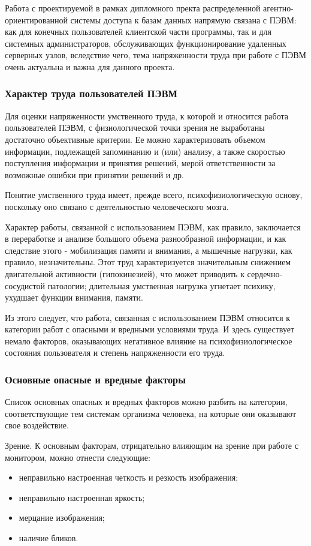 Работа с проектируемой в рамках дипломного пректа распределенной агентно-ориентированной системы доступа к базам данных напрямую связана с  ПЭВМ: как для конечных пользователей клиентской части программы, так и для системных администраторов, обслуживающих функционирование удаленных серверных узлов, вследствие чего, тема напряженности труда при работе с ПЭВМ очень актуальна и важна для данного проекта.

\subsubsection{Характер труда пользователей ПЭВМ}
Для оценки напряженности умственного труда, к которой и относится работа пользователей ПЭВМ, с физиологической точки зрения не выработаны достаточно объективные критерии. Ее можно характеризовать объемом информации, подлежащей запоминанию и (или) анализу, а также скоростью поступления информации и принятия решений, мерой ответственности за возможные ошибки при принятии решений и др.

Понятие умственного труда имеет, прежде всего, психофизиологическую основу, поскольку оно связано с деятельностью человеческого мозга.

Характер работы, связанной с использованием ПЭВМ, как правило, заключается в переработке и анализе большого объема разнообразной информации, и как следствие этого - мобилизация памяти и внимания, а мышечные нагрузки, как правило, незначительны. Этот труд характеризуется значительным снижением двигательной активности (гипокинезией), что может приводить к сердечно-сосудистой патологии; длительная умственная нагрузка угнетает психику, ухудшает функции внимания, памяти.

Из этого следует, что работа, связанная с использованием ПЭВМ относится к категории работ с опасными и вредными условиями труда. И здесь существует немало факторов, оказывающих негативное влияние на психофизиологическое состояния пользователя и степень напряженности его труда.

\subsubsection{Основные опасные и вредные факторы}
Список основных опасных и вредных факторов можно разбить на категории, соответствующие тем системам организма человека, на которые они оказывают свое воздействие.

Зрение. К основным факторам, отрицательно влияющим на зрение при работе с монитором, можно отнести следующие:
\begin{itemize}
\item неправильно настроенная четкость и резкость изображения;
\item неправильно настроенная яркость;
\item мерцание изображения;
\item наличие бликов.
\end{itemize}

